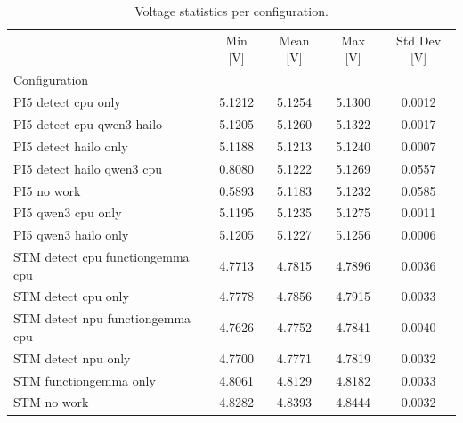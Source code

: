 \begin{table}[H]
\caption{Voltage statistics per configuration.}
\label{tab:voltage_stats}
\begin{tabular}{lcccc}
\toprule
 & Min [V] & Mean [V] & Max [V] & Std Dev [V] \\
Configuration &  &  &  &  \\
\midrule
PI5 detect cpu only & 5.1212 & 5.1254 & 5.1300 & 0.0012 \\
PI5 detect cpu qwen3 hailo & 5.1205 & 5.1260 & 5.1322 & 0.0017 \\
PI5 detect hailo only & 5.1188 & 5.1213 & 5.1240 & 0.0007 \\
PI5 detect hailo qwen3 cpu & 0.8080 & 5.1222 & 5.1269 & 0.0557 \\
PI5 no work & 0.5893 & 5.1183 & 5.1232 & 0.0585 \\
PI5 qwen3 cpu only & 5.1195 & 5.1235 & 5.1275 & 0.0011 \\
PI5 qwen3 hailo only & 5.1205 & 5.1227 & 5.1256 & 0.0006 \\
STM detect cpu functiongemma cpu & 4.7713 & 4.7815 & 4.7896 & 0.0036 \\
STM detect cpu only & 4.7778 & 4.7856 & 4.7915 & 0.0033 \\
STM detect npu functiongemma cpu & 4.7626 & 4.7752 & 4.7841 & 0.0040 \\
STM detect npu only & 4.7700 & 4.7771 & 4.7819 & 0.0032 \\
STM functiongemma only & 4.8061 & 4.8129 & 4.8182 & 0.0033 \\
STM no work & 4.8282 & 4.8393 & 4.8444 & 0.0032 \\
\bottomrule
\end{tabular}
\end{table}
